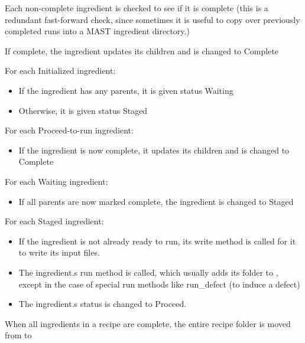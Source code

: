 \documentclass[letterpaper,10pt,english]{sphinxmanual}
\begin{document}
Each non-complete ingredient is checked to see if it is complete (this is a redundant fast-forward check, since sometimes it is useful to copy over previously completed runs into a MAST ingredient directory.)

If complete, the ingredient updates its children and is changed to Complete

For each Initialized ingredient:
\begin{itemize}
\item {} 
If the ingredient has any parents, it is given status Waiting

\item {} 
Otherwise, it is given status Staged

\end{itemize}

For each Proceed-to-run ingredient:
\begin{itemize}
\item {} 
If the ingredient is now complete, it updates its children and is changed to Complete

\end{itemize}

For each Waiting ingredient:
\begin{itemize}
\item {} 
If all parents are now marked complete, the ingredient is changed to Staged

\end{itemize}

For each Staged ingredient:
\begin{itemize}
\item {} 
If the ingredient is not already ready to run, its write method is called for it to write its input files.

\item {} 
The ingredient.s run method is called, which usually adds its folder to , except in the case of special run methods like run\_defect (to induce a defect)

\item {} 
The ingredient.s status is changed to Proceed.

\end{itemize}

When all ingredients in a recipe are complete, the entire recipe folder is moved from  to 
\end{document}
